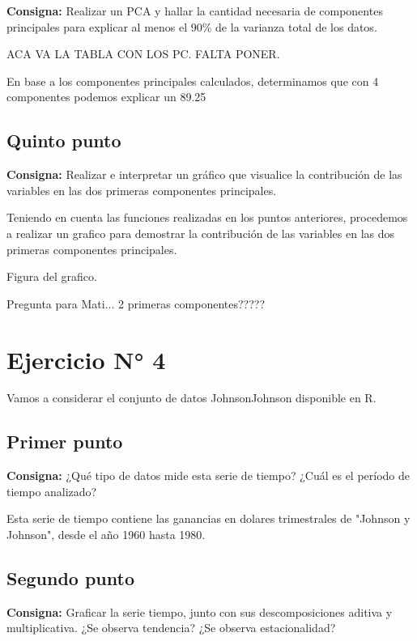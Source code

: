 \documentclass{article} %
\begin{document}
\textbf{Consigna:} Realizar un PCA y hallar la cantidad necesaria de componentes principales para explicar al menos el 90\% de la varianza total de los datos.

ACA VA LA TABLA CON LOS PC. FALTA PONER.


En base a los componentes principales calculados, determinamos que con 4 componentes podemos explicar un 89.25%

\subsection{Quinto punto}

\textbf{Consigna:} Realizar e interpretar un gráfico que visualice la contribución de las variables en las dos primeras componentes principales.

Teniendo en cuenta las funciones realizadas en los puntos anteriores, procedemos a realizar un grafico para demostrar la contribución de las variables en las dos primeras componentes principales. 


Figura del grafico.


Pregunta para Mati... 2 primeras componentes?????

\section{Ejercicio N° 4}

Vamos a considerar el conjunto de datos JohnsonJohnson disponible en R.

\subsection{Primer punto}

\textbf{Consigna:} ¿Qué tipo de datos mide esta serie de tiempo? ¿Cuál es el período de tiempo analizado?

Esta serie de tiempo contiene las ganancias en dolares trimestrales de "Johnson y Johnson", desde el año 1960 hasta 1980.

\subsection{Segundo punto}

\textbf{Consigna:} Graficar la serie tiempo, junto con sus descomposiciones aditiva y multiplicativa. ¿Se observa tendencia? ¿Se observa estacionalidad?
\end{document}
